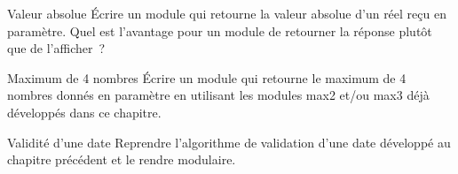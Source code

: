 \begin{Exercice}{Valeur absolue}
	Écrire un module qui retourne la valeur absolue d’un
	réel reçu en paramètre.
	Quel est l’avantage pour un module de retourner la réponse 
	plutôt que de l’afficher~?
\end{Exercice}

\begin{Exercice}{Maximum de 4 nombres}
	Écrire un module qui retourne le maximum de 4
	nombres donnés en paramètre en utilisant les modules
	max2 et/ou max3 déjà développés dans ce chapitre.
\end{Exercice}

\begin{Exercice}{Validité d’une date}
	Reprendre l’algorithme de validation d’une date 
	développé au chapitre précédent et le rendre modulaire.
\end{Exercice}

